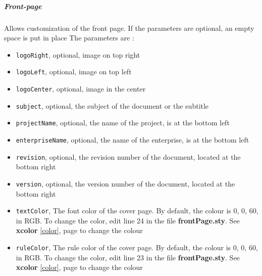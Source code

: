 \subparagraph{Front-page}
Allows customization of the front page. If the parameters are optional, an empty space is put in
place
The parameters are :
\begin{itemize}
    \item \texttt{logoRight}, optional, image on top right
    \item \texttt{logoLeft}, optional, image on top left
    \item \texttt{logoCenter}, optional, image in the center
    \item \texttt{subject}, optional, the subject of the document or the subtitle
    \item \texttt{projectName}, optional, the name of the project, is at the bottom left
    \item \texttt{enterpriseName}, optional, the name of the enterprise, is at the bottom
          left
    \item \texttt{revision}, optional, the revision number of the document, located at
          the bottom right
    \item \texttt{version}, optional, the version number of the document, located at the
          bottom right
    \item \texttt{textColor}, The font color of the cover page. By default, the colour is
          0, 0, 60, in RGB. To change the color, edit line 24 in the file \textbf{frontPage.sty}.
          See \textbf{xcolor} \ref{color}, page \pageref{color} to change the colour
    \item \texttt{ruleColor}, The rule color of the cover page. By default, the colour is
          0, 0, 60, in RGB. To change the color, edit line 23 in the file \textbf{frontPage.sty}.
          See \textbf{xcolor} \ref{color}, page \pageref{color} to change the colour
\end{itemize}

